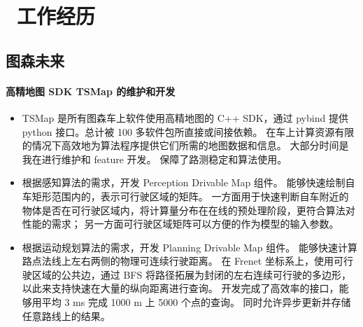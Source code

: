 \section{\faUsers\ 工作经历}


\subsection{图森未来}
    \paragraph{高精地图 SDK TSMap 的维护和开发}
        \begin{itemize}
            \item 
                TSMap 是所有图森车上软件使用高精地图的 C++ SDK，通过 pybind 提供 python 接口。总计被 100 多软件包所直接或间接依赖。
                在车上计算资源有限的情况下高效地为算法程序提供它们所需的地图数据和信息。
                大部分时间是我在进行维护和 feature 开发。
                保障了路测稳定和算法使用。
            \item 
                根据感知算法的需求，开发 Perception Drivable Map 组件。
                能够快速绘制自车矩形范围内的，表示可行驶区域的矩阵。
                一方面用于快速判断自车附近的物体是否在可行驶区域内，将计算量分布在在线的预处理阶段，更符合算法对性能的需求；
                另一方面可行驶区域矩阵可以方便的作为模型的输入参数。
            \item 
                根据运动规划算法的需求，开发 Planning Drivable Map 组件。
                能够快速计算路点法线上左右两侧的物理可连续行驶距离。
                在 Frenet 坐标系上，使用可行驶区域的公共边，通过 BFS 将路径拓展为封闭的左右连续可行驶的多边形，以此来支持快速在大量的纵向距离进行查询。
                开发完成了高效率的接口，能够用平均 3 ms 完成 1000 m 上 5000 个点的查询。
                同时允许异步更新并存储任意路线上的结果。
        \end{itemize}


